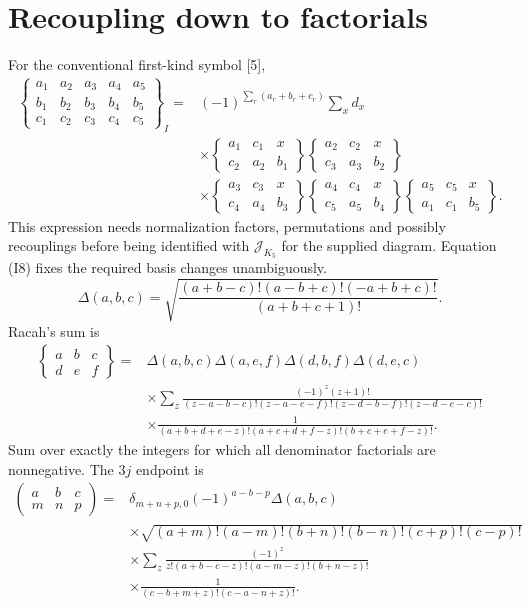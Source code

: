 \documentclass[11pt,a4paper]{article}
\newcommand{\eq}[2]{\begin{equation}#2\tag{#1}\end{equation}}
\begin{document}
\section{Recoupling down to factorials}
For the conventional first-kind symbol [5],
\eq{R1}{\begin{aligned}
\begin{Bmatrix}a_1&a_2&a_3&a_4&a_5\\b_1&b_2&b_3&b_4&b_5\\c_1&c_2&c_3&c_4&c_5\end{Bmatrix}_{I}
={}&(-1)^{\sum_r(a_r+b_r+c_r)}\sum_xd_x\\
&\times\begin{Bmatrix}a_1&c_1&x\\c_2&a_2&b_1\end{Bmatrix}\begin{Bmatrix}a_2&c_2&x\\c_3&a_3&b_2\end{Bmatrix}\\
&\times\begin{Bmatrix}a_3&c_3&x\\c_4&a_4&b_3\end{Bmatrix}\begin{Bmatrix}a_4&c_4&x\\c_5&a_5&b_4\end{Bmatrix}\begin{Bmatrix}a_5&c_5&x\\a_1&c_1&b_5\end{Bmatrix}.
\end{aligned}}
This expression needs normalization factors, permutations and possibly recouplings before being identified with $\mathcal J_{K_5}$ for the supplied diagram. Equation (I8) fixes the required basis changes unambiguously.
\eq{R2}{\Delta(a,b,c)=\sqrt{\frac{(a+b-c)!(a-b+c)!(-a+b+c)!}{(a+b+c+1)!}}.}
Racah's sum is
\eq{R3}{\begin{aligned}
\begin{Bmatrix}a&b&c\\d&e&f\end{Bmatrix}={}&\Delta(a,b,c)\Delta(a,e,f)\Delta(d,b,f)\Delta(d,e,c)\\
&\times\sum_z\frac{(-1)^z(z+1)!}{(z-a-b-c)!(z-a-e-f)!(z-d-b-f)!(z-d-e-c)!}\\
&\times\frac1{(a+b+d+e-z)!(a+c+d+f-z)!(b+c+e+f-z)!}.
\end{aligned}}
Sum over exactly the integers for which all denominator factorials are nonnegative. The $3j$ endpoint is
\eq{R4}{\begin{aligned}
\begin{pmatrix}a&b&c\\m&n&p\end{pmatrix}={}&\delta_{m+n+p,0}(-1)^{a-b-p}\Delta(a,b,c)\\
&\times\sqrt{(a+m)!(a-m)!(b+n)!(b-n)!(c+p)!(c-p)!}\\
&\times\sum_z\frac{(-1)^z}{z!(a+b-c-z)!(a-m-z)!(b+n-z)!}\\
&\times\frac1{(c-b+m+z)!(c-a-n+z)!}.
\end{aligned}}
\end{document}
